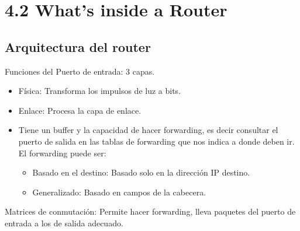 \documentclass[12pt, twoside, openright]{report} %
\begin{document}
\section{4.2 What's inside a Router}
\subsection{Arquitectura del router}
\begin{figure}[H]
	{\def\svgwidth{.8\textwidth}
		}
\end{figure}
Funciones del Puerto de entrada: 3 capas.
\begin{itemize}
	\item Física: Transforma los impulsos de luz a bits.
	\item Enlace: Procesa la capa de enlace.
	\item Tiene un buffer y la capacidad de hacer forwarding, es decir
	      consultar el puerto de salida en las tablas de forwarding que nos
	      indica a donde deben ir. El forwarding puede ser:

	      \begin{itemize}
		      \item Basado en el destino: Basado solo en la dirección IP destino.
		      \item Generalizado: Basado en campos de la cabecera.
	      \end{itemize}
\end{itemize}

Matrices de conmutación: Permite hacer forwarding, lleva paquetes
del puerto de entrada a los de salida adecuado.
\end{document}
